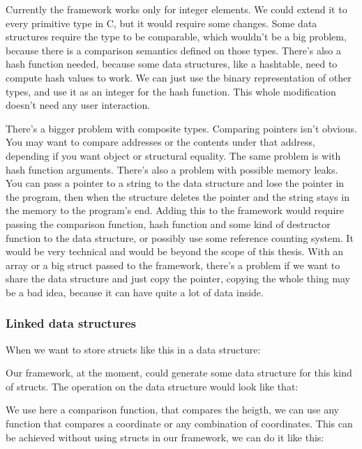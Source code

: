 \documentclass[11pt]{article}
\begin{document}
		Currently the framework works only for integer elements. We could extend it to every primitive type in
		C, but it would require some changes.  Some data structures require the type to be comparable, which
		wouldn't be a big problem, because there is a comparison semantics defined on those types. There's also
		a hash function needed, because some data structures, like a hashtable, need to compute hash values to
		work. We can just use the binary representation of other types, and use it as an integer for the hash
		function. This whole modification doesn't need any user interaction.

		There's a bigger problem with composite types. Comparing pointers isn't obvious. You may want to compare
		addresses or the contents under that address, depending if you want object or structural equality. The
		same problem is with hash function arguments. There's also a problem with possible memory leaks. You can
		pass a pointer to a string to the data structure and lose the pointer in the program, then when the
		structure deletes the pointer and the string stays in the memory to the program's end. Adding this to
		the framework would require passing the comparison function, hash function and some kind of destructor
		function to the data structure, or possibly use some reference counting system. It would be very
		technical and would be beyond the scope of this thesis. With an array or a big struct passed to the
		framework, there's a problem if we want to share the data structure and just copy the pointer, copying
		the whole thing may be a bad idea, because it can have quite a lot of data inside.

		\subsubsection{Linked data structures}

			When we want to store structs like this in a data structure:

			

			Our framework, at the moment, could generate some data structure for this kind of structs. The
			operation on the data structure would look like that:

			

			We use here a comparison function, that compares the heigth, we can use any function that
			compares a coordinate or any combination of coordinates. This can be achieved without using
			structs in our framework, we can do it like this:
\end{document}
